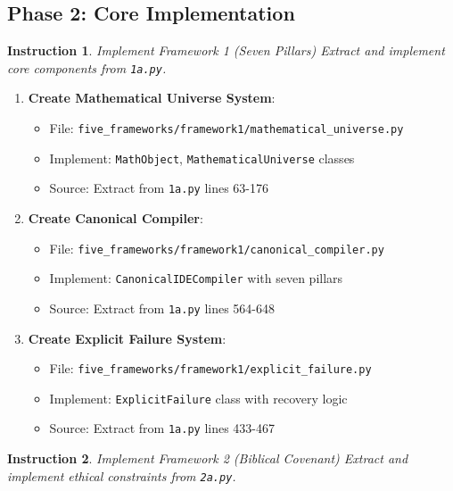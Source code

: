 \documentclass[12pt]{article}
\newtheorem{instruction}{Instruction}
\begin{document}
\subsection{Phase 2: Core Implementation}

\begin{instruction}{Implement Framework 1 (Seven Pillars)}
Extract and implement core components from \texttt{1a.py}.
\end{instruction}

\begin{enumerate}
    \item \textbf{Create Mathematical Universe System}:
    \begin{itemize}
        \item File: \texttt{five\_frameworks/framework1/mathematical\_universe.py}
        \item Implement: \texttt{MathObject}, \texttt{MathematicalUniverse} classes
        \item Source: Extract from \texttt{1a.py} lines 63-176
    \end{itemize}

    \item \textbf{Create Canonical Compiler}:
    \begin{itemize}
        \item File: \texttt{five\_frameworks/framework1/canonical\_compiler.py}
        \item Implement: \texttt{CanonicalIDECompiler} with seven pillars
        \item Source: Extract from \texttt{1a.py} lines 564-648
    \end{itemize}

    \item \textbf{Create Explicit Failure System}:
    \begin{itemize}
        \item File: \texttt{five\_frameworks/framework1/explicit\_failure.py}
        \item Implement: \texttt{ExplicitFailure} class with recovery logic
        \item Source: Extract from \texttt{1a.py} lines 433-467
    \end{itemize}
\end{enumerate}

\begin{instruction}{Implement Framework 2 (Biblical Covenant)}
Extract and implement ethical constraints from \texttt{2a.py}.
\end{instruction}
\end{document}
